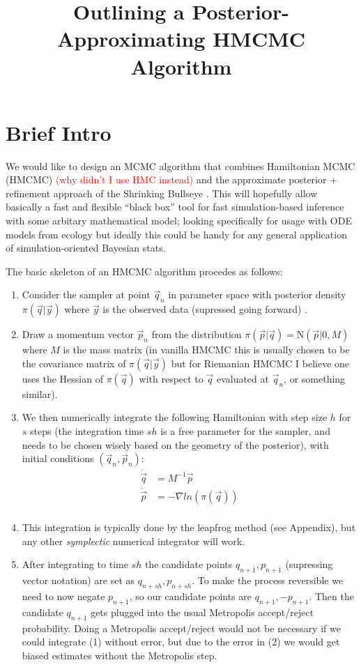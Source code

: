\documentclass[12pt,a4paper]{article}
\title{Outlining a Posterior-Approximating HMCMC Algorithm}
\newcommand{\rojo}{\textcolor{red}}
\begin{document}
\maketitle
\section{Brief Intro}
We would like to design an MCMC algorithm that combines Hamiltonian MCMC (HMCMC) \rojo{(why didn't I use HMC instead)} \parencite{neal_mcmc_2012,betancourt_geometric_2014,betancourt_conceptual_2017} and the approximate posterior + refinement approach of the Shrinking Bullseye \parencite{conrad_accelerating_2015}.  This will hopefully allow basically a fast and flexible ``black box'' tool for fast simulation-based inference with some arbitary mathematical model; looking specifically for usage with ODE models from ecology but ideally this could be handy for any general application of simulation-oriented Bayesian stats.

The basic skeleton of an HMCMC algorithm procedes as follows:
\begin{enumerate}
\item Consider the sampler at point $\vec{q}_n$ in parameter space with posterior density $\pi(\vec{q} | \vec{y})$ where $\vec{y}$ is the observed data (supressed going forward) .
\item Draw a momentum vector $\vec{p}_n$ from the distribution $\pi(\vec{p} | \vec{q} ) = \text{N}(\vec{p} |0, M)$ where $M$ is the mass matrix (in vanilla HMCMC this is usually chosen to be the covariance matrix of $\pi(\vec{q}|\vec{y})$ but for Riemanian HMCMC I believe one uses the Hessian of $\pi(\vec{q})$ with respect to $\vec{q}$ evaluated at $\vec{q}_n$, or something similar).
\item We then numerically integrate the following Hamiltonian with step size $h$ for $s$ steps (the integration time $sh$ is a free parameter for the sampler, and needs to be chosen wisely based on the geometry of the posterior), with initial conditions $(\vec{q}_n, \vec{p}_n)$:
\begin{equation}
\begin{split}
\dot{\vec{q}} &= M^{-1} \vec{p} \\
\dot{\vec{p}} &= - \nabla ln(\pi(\vec{q}))\\
\end{split}
\end{equation}
\item This integration is typically done by the leapfrog method (see Appendix), but any other \textit{symplectic} numerical integrator will work.
\item After integrating to time $sh$ the candidate points $q_{n+1}, p_{n+1}$ (supressing vector notation) are set as $q_{n+sh}, p_{n+sh}$.  To make the process reversible we need to now negate $p_{n+1}$, so our candidate points are $q_{n+1}, -p_{n+1}$.  Then the candidate $q_{n+1}$ gets plugged into the usual Metropolis accept/reject probability.  Doing a Metropolis accept/reject would not be necessary if we could integrate (1) without error, but due to the error in (2) we would get biased estimates without the Metropolis step.
\end{enumerate}
\end{document}
